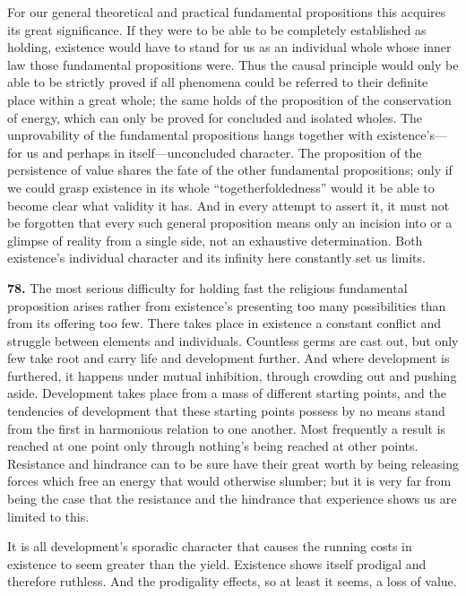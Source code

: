 \documentclass[12pt,a4paper]{book}
\newcommand{\opage}[1]{\marginnote{\footnotesize\textit{[#1]}}}
\begin{document}
For our general theoretical and practical fundamental propositions this acquires its great significance. If
they were to be able to be completely established as holding, existence would have to stand for us as an
individual whole whose inner law those fundamental propositions were. Thus the causal principle would only
be able to be strictly proved if all phenomena could be referred to their definite place within a great
\opage{180}whole; the same holds of the proposition of the conservation of energy, which can only be proved for
concluded and isolated wholes. The unprovability of the fundamental propositions hangs together with
existence's---for us and perhaps in itself---unconcluded character. The proposition of the persistence of
value shares the fate of the other fundamental propositions; only if we could grasp existence in its whole
``togetherfoldedness'' would it be able to become clear what validity it has. And in every attempt to assert
it, it must not be forgotten that every such general proposition means only an incision into or a glimpse of
reality from a single side, not an exhaustive determination. Both existence's individual character and its
infinity here constantly set us limits.

\medskip

\noindent\textbf{78.} The most serious difficulty for holding fast the religious fundamental
proposition arises rather from existence's presenting too many possibilities than from its
offering too few. There takes place in existence a constant conflict and struggle between elements
and individuals. Countless germs are cast out, but only few take root and carry life and
development further. And where development is furthered, it happens under mutual inhibition,
through crowding out and pushing aside. Development takes place from a mass of different starting
points, and the tendencies of development that these starting points possess by no means stand from
the first in harmonious relation to one another. Most frequently a result is reached at one point
only through nothing's being reached at other points. Resistance and hindrance can to be sure have
their great worth by being releasing forces which free an energy that would otherwise slumber; but
it is very far from being the case that the resistance and the hindrance that experience shows us
are limited to this.

It is all development's sporadic character that causes the running costs in existence to seem
greater than the yield. Existence shows itself prodigal and therefore ruthless. And the prodigality
effects, so at least it seems, a loss of value.
\end{document}
